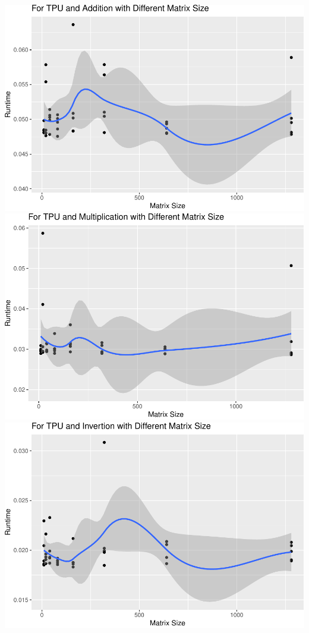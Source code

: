 \documentclass[
]{article}
\begin{document}
\includegraphics{main_files/figure-latex/unnamed-chunk-62-7.pdf}
\includegraphics{main_files/figure-latex/unnamed-chunk-62-8.pdf}
\includegraphics{main_files/figure-latex/unnamed-chunk-62-9.pdf}
\end{document}
